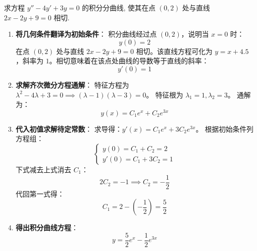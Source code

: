 \documentclass[lang=cn,11pt]{elegantbook}
\begin{document}
\begin{exercise}[二阶齐次方程的初值问题]
求方程 $y''-4y'+3y=0$ 的积分分曲线, 使其在点 $(0,2)$ 处与直线 $2x-2y+9=0$ 相切.
\end{exercise}
\begin{solution}
\begin{enumerate}
    \item \textbf{将几何条件翻译为初始条件}：
    积分曲线经过点 $(0,2)$，说明当 $x=0$ 时：
    \[
    y(0) = 2
    \]
    在点 $(0,2)$ 处与直线 $2x-2y+9=0$ 相切。该直线方程可化为 $y = x + 4.5$，斜率为 $1$。相切意味着在该点处曲线的导数等于直线的斜率：
    \[
    y'(0) = 1
    \]
    
    \item \textbf{求解齐次微分方程通解}：
    特征方程为 $\lambda^2 - 4\lambda + 3 = 0 \implies (\lambda-1)(\lambda-3) = 0$。
    特征根为 $\lambda_1 = 1, \lambda_2 = 3$。
    通解为：
    \[
    y(x) = C_1 e^x + C_2 e^{3x}
    \]
    
    \item \textbf{代入初值求解待定常数}：
    求导得：$y'(x) = C_1 e^x + 3C_2 e^{3x}$。
    根据初始条件列方程组：
    \[
    \begin{cases}
    y(0) = C_1 + C_2 = 2 \\
    y'(0) = C_1 + 3C_2 = 1
    \end{cases}
    \]
    下式减去上式消去 $C_1$：
    \[
    2C_2 = -1 \implies C_2 = -\frac{1}{2}
    \]
    代回第一式得：
    \[
    C_1 = 2 - \left(-\frac{1}{2}\right) = \frac{5}{2}
    \]
    
    \item \textbf{得出积分曲线方程}：
    \[
    y = \frac{5}{2} e^x - \frac{1}{2} e^{3x}
    \]
\end{enumerate}
\end{solution}
\end{document}
